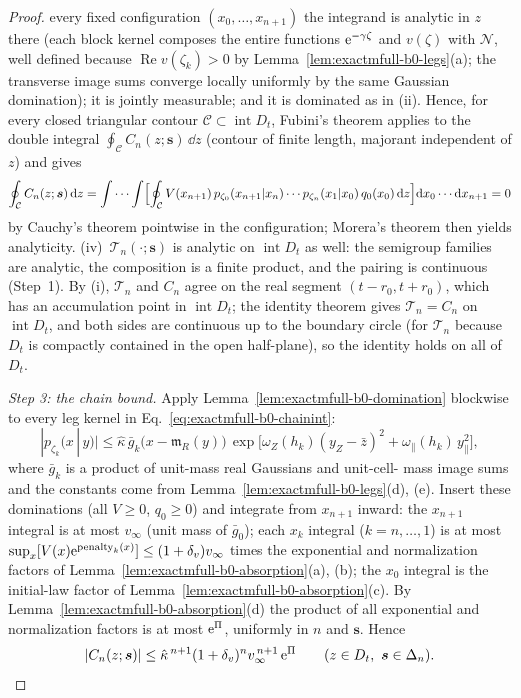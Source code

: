 \begin{proof}
every fixed configuration \((x_0,\ldots,x_{n+1})\) the integrand is
analytic in \(z\) there (each block kernel composes the entire functions
\(\mathrm e^{-\gamma\zeta}\) and \(v(\zeta)\) with \(\mathcal N\), well defined
because \(\operatorname{Re}v(\zeta_k)>0\) by
Lemma~\ref{lem:exactmfull-b0-legs}(a); the transverse image sums converge
locally uniformly by the same Gaussian domination); it is jointly
measurable; and it is dominated as in (ii).  Hence, for every closed
triangular contour \(\mathcal C\subset\operatorname{int}D_t\), Fubini's
theorem applies to the double integral
\(\oint_{\mathcal C}C_n(z;\bm s)\,\dd z\) (contour of finite length,
majorant independent of \(z\)) and gives
\begin{equation*}
 \oint_{\mathcal C}C_n(z;\bm s)\,\mathrm d z
 =\idotsint
 \Bigl[\oint_{\mathcal C}
 V(x_{n+1})\,p_{\zeta_0}(x_{n+1}|x_n)\cdots
 p_{\zeta_n}(x_1|x_0)\,q_0(x_0)\,\mathrm d z\Bigr]
 \mathrm d x_0\cdots\mathrm d x_{n+1}
 =0
\end{equation*}
by Cauchy's theorem pointwise in the configuration; Morera's theorem then
yields analyticity.
(iv)~\(\mathcal T_n(\cdot;\bm s)\) is analytic on
\(\operatorname{int}D_t\) as well: the semigroup families are analytic, the
composition is a finite product, and the pairing is continuous (Step~1).
By (i), \(\mathcal T_n\) and \(C_n\) agree on the real segment
\((t-r_0,t+r_0)\), which has an accumulation point in
\(\operatorname{int}D_t\); the identity theorem gives
\(\mathcal T_n=C_n\) on \(\operatorname{int}D_t\), and both sides are
continuous up to the boundary circle (for \(\mathcal T_n\) because
\(D_t\) is compactly contained in the open half-plane), so the identity
holds on all of \(D_t\).

\emph{Step 3: the chain bound.}
Apply Lemma~\ref{lem:exactmfull-b0-domination} blockwise to every leg
kernel in Eq.~\eqref{eq:exactmfull-b0-chainint}:
\begin{equation*}
 |p_{\zeta_k}(x\,|\,y)|
 \le\hat\kappa\,\bar g_k\bigl(x-\mathfrak m_R(y)\bigr)\,
 \exp\!\bigl[\omega_Z(h_k)(y_Z-\bar z)^2
 +\omega_\parallel(h_k)\,y_\parallel^2\bigr],
\end{equation*}
where \(\bar g_k\) is a product of unit-mass real Gaussians and unit-cell-%
mass image sums and the constants come from
Lemma~\ref{lem:exactmfull-b0-legs}(d), (e).  Insert these dominations (all
\(V\ge0\), \(q_0\ge0\)) and integrate from \(x_{n+1}\) inward: the
\(x_{n+1}\) integral is at most \(v_\infty\) (unit mass of
\(\bar g_0\)); each \(x_k\) integral (\(k=n,\ldots,1\)) is at most
\(\sup_x[V(x)\mathrm e^{\text{penalty}_k(x)}]\le(1+\delta_v)v_\infty\) times the
exponential and normalization factors of
Lemma~\ref{lem:exactmfull-b0-absorption}(a), (b); the \(x_0\) integral is
the initial-law factor of Lemma~\ref{lem:exactmfull-b0-absorption}(c).  By
Lemma~\ref{lem:exactmfull-b0-absorption}(d) the product of all exponential
and normalization factors is at most \(\mathrm e^{\Pi}\), uniformly in \(n\) and
\(\bm s\).  Hence
\begin{equation}
 |C_n(z;\bm s)|
 \le\hat\kappa^{\,n+1}(1+\delta_v)^n v_\infty^{\,n+1}\,\mathrm e^{\Pi}
 \qquad(z\in D_t,\ \bm s\in\Delta_n).
 \label{eq:exactmfull-b0-chainbound}
\end{equation}


\end{proof}
